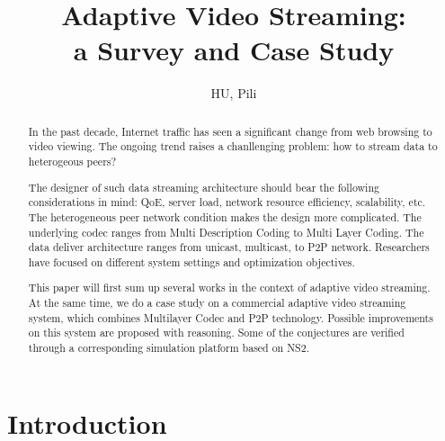 \documentclass[11pt,a4paper]{article}
\author{HU, Pili}
\title{Adaptive Video Streaming: 
 \\a Survey and Case Study}
\begin{document}
\maketitle

\begin{abstract}
	In the past decade, Internet traffic has seen a significant 
	change from web browsing to video viewing. The ongoing trend 
	raises a chanllenging problem: how to stream data to heterogeous 
	peers? 
	
	The designer of such data streaming architecture should 
	bear the following considerations in mind: QoE, server load, 
	network resource efficiency, scalability, etc. The heterogeneous 
	peer network condition makes the design more complicated. The 
	underlying codec ranges from Multi Description Coding to Multi 
	Layer Coding. The data deliver architecture ranges from unicast,
	 multicast, to P2P network. Researchers have focused on different 
	 system settings and optimization objectives. 
	 
	 This paper will first
	  sum up several works in the context of adaptive video streaming. 
	  At the same time, we do a case study on a commercial adaptive 
	  video streaming system, which combines Multilayer Codec and P2P 
	  technology. Possible improvements on this system are proposed
	   with reasoning. Some of the conjectures are
	   verified through a corresponding simulation platform based on NS2. 
\end{abstract}

\pagebreak
\tableofcontents
\pagebreak

\section{Introduction}
\end{document}
